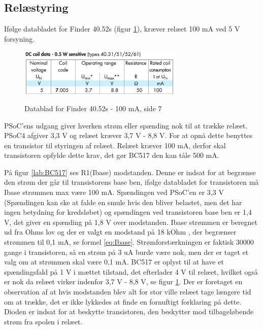 \subsection{Relæstyring}

Ifølge databladet for Finder 40.52s (figur \ref{lab:finder4052s}), kræver relæet 100 mA ved 5 V forsyning.

\begin{figure}[H] \centering
{\includegraphics[width=0.7\textwidth]{filer/design/Billeder/finder4052s}}
\caption{Datablad for Finder 40.52s - 100 mA, side 7}
\label{lab:finder4052s}
\raggedright
\end{figure} 

PSoC'ens udgang giver hverken strøm eller spænding nok til at trække relæet. PSoC4 afgiver 3,3 V og relæet kræver 3,7 V - 8,8 V. For at opnå dette benyttes en transistor til styringen af relæet. Relæet kræver 100 mA, derfor skal transistoren opfylde dette krav, det gør BC517 den kan tåle 500 mA. \newline

På figur \ref{lab:BC517} ses R1(Ibase) modstanden. Denne er indsat for at begrænse den strøm der går til transistorens base ben, ifølge databladet for transistoren må Ibase strømmen max være 100 mA. Spændingen ved PSoC'en er 3,3 V (Spændingen kan ske at falde en smule hvis den bliver belastet, men det har ingen betydning for kredsløbet) og spændingen ved transistoren base ben er 1,4 V, det giver en spænding på 1,8 V over modstanden. Ibase strømmen er beregnet ud fra Ohms lov og der er valgt en modstand på 18 kOhm , der begrænser strømmen til 0,1 mA, se formel \ref{eq:Ibase}.
\newline \newline
Strømforstærkningen er faktisk 30000 gange i transistoren, så en strøm på 3 uA burde være nok, men der er taget et valg om at strømmen skal være 0,1 mA. BC517 er oplyst til at have et spændingsfald på 1 V i mættet tilstand, det efterlader 4 V til relæet, hvilket også er nok da relæet virker indenfor 3,7 V - 8,8 V, se figur \ref{lab:finder4052s}. Der er foretaget en observation af at hvis modstanden blev alt for stor ville relæet tage længere tid om at trække, det er ikke lykkedes at finde en fornuftigt forklaring på dette. Dioden er indsat for at beskytte transistoren, den beskytter mod tilbageløbende strøm fra spolen i relæet.

